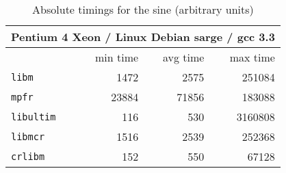 \begin{table}[!htb]
\begin{center}
\renewcommand{\arraystretch}{1.2}
\begin{tabular}{|l|r|r|r|}
\hline
 \multicolumn{4}{|c|}{Pentium 4 Xeon / Linux Debian sarge / gcc 3.3}   \\ 
 \hline
                        & min time       & avg time     & max time        \\ 
 \hline
 \texttt{libm}          & 1472          &       2575    & 251084      \\ 
 \hline
 \texttt{mpfr}          & 23884         &      71856    & 183088      \\ 
 \hline
 \texttt{libultim}      & 116           &        530    & 3160808      \\ 
 \hline
 \texttt{libmcr}        & 1516          &       2539    & 252368      \\ 
 \hline
\texttt{crlibm}         & 152           &        550    & 67128      \\ 
 \hline
\end{tabular}
\end{center}
\caption{Absolute timings for the sine (arbitrary units)
  \label{tbl:tan_abstime}}
\end{table}


